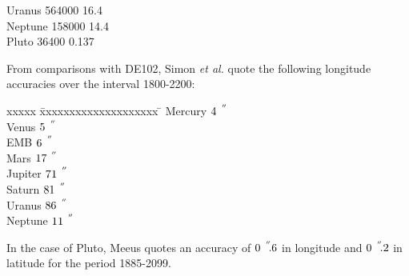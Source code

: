 \documentclass[11pt,fleqn,twoside]{article}
\renewcommand{\_}{{\tt\char'137}}     %
\newcommand{\arcseci}[1] {$#1\hspace{0.05em}$\raisebox{-0.5ex}
                         {$^{'\hspace{-0.1em}'\hspace{0.0em}}$}}
\newcommand{\arcsec}[2] {\arcseci{#1}$\hspace{-0.35em}.#2$}
\begin{document}
{\begin{enumerate}
\begin{tabbing}
         \> Uranus  \> \hspace{0.5em}564000 \> \hspace{2em}16.4 \\
         \> Neptune \> \hspace{0.5em}158000 \> \hspace{2em}14.4 \\
         \> Pluto \> \hspace{1em}36400 \> \hspace{2.5em}0.137
        \end{tabbing}
        From comparisons with DE102,
        Simon {\it et al.}\/ quote the following
        longitude accuracies over the interval 1800-2200:
        \begin{tabbing}
         xxxxx \= xxxxxxxxxxxxxxxxxxxx \= \kill
         \> Mercury \> \hspace{0.5em}\arcseci{4} \\
         \> Venus   \> \hspace{0.5em}\arcseci{5} \\
         \> EMB     \> \hspace{0.5em}\arcseci{6} \\
         \> Mars    \> \arcseci{17} \\
         \> Jupiter \> \arcseci{71} \\
         \> Saturn  \> \arcseci{81} \\
         \> Uranus  \> \arcseci{86} \\
         \> Neptune \> \arcseci{11}
        \end{tabbing}
        In the case of Pluto, Meeus quotes an accuracy of \arcsec{0}{6}
        in longitude and \arcsec{0}{2} in latitude for the period
        1885-2099.
 

\end{enumerate}}
\end{document}
